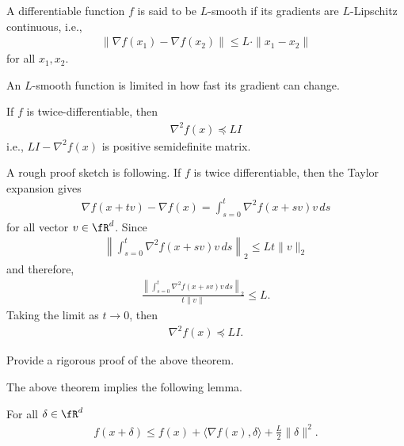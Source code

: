 \documentclass{article}
\begin{document}
\begin{definition}
    A differentiable function $f$ is said to be $L$-smooth if its gradients are $L$-Lipschitz continuous, i.e.,
    \begin{align}
        \|\nabla f(x_1) - \nabla f(x_2)\| \leq L \cdot \|x_1-x_2\|
    \end{align}
    for all $x_1, x_2$.
\end{definition}
An $L$-smooth function is limited in how fast its gradient can change.

\begin{theorem}
    If $f$ is twice-differentiable, then
    \begin{align}
        \nabla^2 f(x) \preceq LI
    \end{align}
    i.e., $LI - \nabla^2 f(x)$ is positive semidefinite matrix.
\end{theorem}
A rough proof sketch is following.
If $f$ is twice differentiable, then the Taylor expansion gives
\begin{align}
    \nabla f(x + tv) - \nabla f(x) = \int_{s=0}^t \nabla^2 f(x+sv)v\, ds
\end{align}
for all vector $v\in\fR^d$.
Since
\begin{align}
    \left\|\int_{s=0}^t \nabla^2 f(x+sv)v\, ds\right\|_2 \leq Lt \|v\|_2
\end{align}
and therefore,
\begin{align}
    \frac{\left\|\int_{s=0}^t \nabla^2 f(x+sv)v\, ds\right\|_2}{t \|v\|} \leq L.
\end{align}
Taking the limit as $t\rightarrow 0$, then
\begin{align}
    \nabla^2 f(x) \preceq L I.
\end{align}

\begin{exercise}
    Provide a rigorous proof of the above theorem.
\end{exercise}

The above theorem implies the following lemma.
\begin{lemma}\label{lem:lipschitz}
    For all $\delta\in \fR^d$
    \begin{align}
        f(x+\delta) \leq f(x) + \langle \nabla f(x), \delta\rangle + \frac{L}{2}\|\delta\|^2. 
    \end{align}
\end{lemma}
\end{document}
